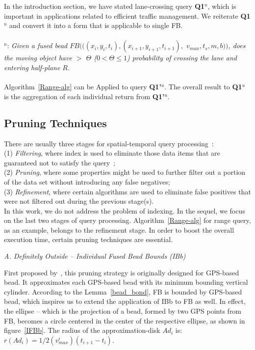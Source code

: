 In the introduction section, we have stated lane-crossing query {\bf Q1}$^u$,
which is important in applications related to efficient traffic management. We reiterate {\bf Q1}$^u$
and convert it into a form that is applicable to single FB.\\
\\
$^u$: {\it Given a fused bead $FB(((x_i, y_i, t_i), (x_{i+1}, y_{i+1}, t_{i+1}),$
$ v_{max}, t_{s}, m, b))$, does the moving object have
$>$ $\Theta$ ($ 0 < \Theta \leq 1$) probability of crossing the lane and entering half-plane $R$}.\\
\\
Algorithm~\ref{Range-alg} can be Applied to query {\bf Q1'}$^u$. The overall result to {\bf Q1}$^u$ is
the aggregation of each individual return from {\bf Q1'}$^u$.

\subsection{Pruning Techniques}
There are usually three stages for spatial-temporal query processing~\cite{GutingS05}:\\

\noindent(1) \textit{Filtering}, where index is used to eliminate those data items that are
guaranteed not to satisfy the query~\cite{TaoXC07,TrajcevskiMDM10};\\
\noindent(2) \textit{Pruning}, where some properties might be used to further filter out a portion
of the data set without introducing any false negatives;\\
\noindent(3) \textit{Refinement}, where certain algorithms are used to eliminate false positives that were not filtered out during the previous stage(s).\\

In this work, we do not address the problem of indexing. In the sequel, we focus on the last two stages of query processing. Algorithm~\ref{Range-alg} for range query, as an example, belongs to the refinement stage. In order to
boost the overall execution time, certain pruning techniques are essential.


\noindent\textit{A. Definitely Outside -- Individual Fused Bead Bounds (IBb)}

First proposed by~\cite{TrajcevskiMDM10}, this pruning strategy is originally designed for GPS-based bead.
It approximates each GPS-based bead with its minimum bounding vertical cylinder. According to the Lemma~\ref{bead_bond}, FB is bounded by GPS-based bead, which inspires us to extend the application of IBb to FB as well.
In effect, the ellipse -- which is the projection of a bead, formed by two GPS points from FB, becomes a circle centered in the center of the respective ellipse, as shown in figure~\ref{IFBb}. The radius of the approximation-disk $Ad_i$ is: $r(Ad_i) = 1/2(v_{max}^i)(t_{i+1} - t_{i})$.

